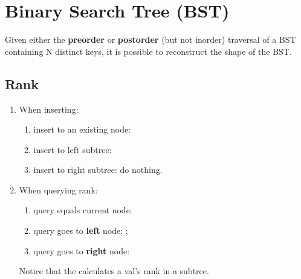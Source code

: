 \section{Binary Search Tree (BST)}
Given either the \textbf{preorder} or \textbf{postorder} (but not inorder) traversal of a BST containing N distinct keys, it is possible to reconstruct the shape of the BST. 
\subsection{Rank}
\begin{enumerate}
\item When inserting: 
  \begin{enumerate}
  \item insert to an existing node: 
  \item insert to left subtree: 
  \item insert to right subtree: do nothing. 
\end{enumerate}
\item When querying rank:
  \begin{enumerate}
  \item query equals current node: 
  \item query goes to \textbf{left} node: ;
  \item query goes to \textbf{right} node:  
  \end{enumerate}
Notice that the  calculates a val's rank in a subtree.
\end{enumerate}


